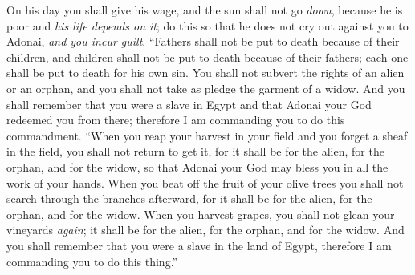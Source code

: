 \begin{biblechapter}
\verse On his day you shall give his wage, and the sun shall not go \textit{down}, because he is poor and \textit{his life depends on it}; do this so that he does not cry out against you to Adonai, \textit{and you incur guilt}.
\verse “Fathers shall not be put to death because of their children, and children shall not be put to death because of their fathers; each one shall be put to death for his own sin.
\verse You shall not subvert the rights of an alien or an orphan, and you shall not take as pledge the garment of a widow.
\verse And you shall remember that you were a slave in Egypt and that Adonai your God redeemed you from there; therefore I am commanding you to do this commandment.
\verse “When you reap your harvest in your field and you forget a sheaf in the field, you shall not return to get it, for it shall be for the alien, for the orphan, and for the widow, so that Adonai your God may bless you in all the work of your hands.
\verse When you beat off the fruit of your olive trees you shall not search through the branches afterward, for it shall be for the alien, for the orphan, and for the widow.
\verse When you harvest grapes, you shall not glean your vineyards \textit{again}; it shall be for the alien, for the orphan, and for the widow.
\verse And you shall remember that you were a slave in the land of Egypt, therefore I am commanding you to do this thing.”
\end{biblechapter}

